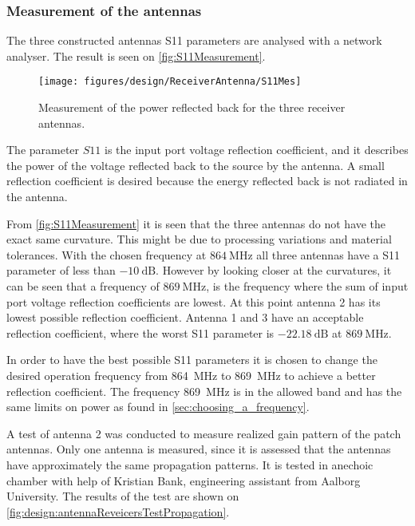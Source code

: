 \subsubsection{Measurement of the antennas}
The three constructed antennas S{11} parameters are analysed with a network analyser. The result is seen on \autoref{fig:S11Measurement}. 

\begin{figure}[h!]
    \centering
        \texttt{[image: figures/design/ReceiverAntenna/S11Mes]}
        \caption{Measurement of the power reflected back for the three receiver antennas.}
        \label{fig:S11Measurement}
\end{figure}

The parameter $S{11}$ is the input port voltage reflection coefficient, and it describes the power of the voltage reflected back to the source by the antenna. A small reflection coefficient is desired because the energy reflected back is not radiated in the antenna.  

From \autoref{fig:S11Measurement} it is seen that the three antennas do not have the exact same curvature. This might be due to processing variations and material tolerances. With the chosen frequency at $\SI{864}{\mega\hertz}$ all three antennas have a S11 parameter of less than $\SI{-10}{\deci\bel}$. However by looking closer at the curvatures, it can be seen that a frequency of $\SI{869}{\mega\hertz}$, is the frequency where the sum of input port voltage reflection coefficients are lowest. At this point antenna 2 has its lowest possible reflection coefficient. Antenna 1 and 3 have an acceptable reflection coefficient, where the worst S11 parameter is $\SI{-22.18}{\deci\bel}$ at $\SI{869}{\mega\hertz}$. 

In order to have the best possible S11 parameters it is chosen to change the desired operation frequency from \SI{864}{\mega\hertz} to \SI{869}{\mega\hertz} to achieve a better reflection coefficient. The frequency \SI{869}{\mega\hertz} is in the allowed band \citep{web:RegulationFreq} and has the same limits on power as found in \autoref{sec:choosing_a_frequency}.  

A test of antenna 2 was conducted to measure realized gain pattern of the patch antennas. Only one antenna is measured, since it is assessed that the antennas have approximately the same propagation patterns. It is tested in anechoic chamber with help of Kristian Bank, engineering assistant from Aalborg University. The results of the test are shown on \autoref{fig:design:antennaReveicersTestPropagation}.

